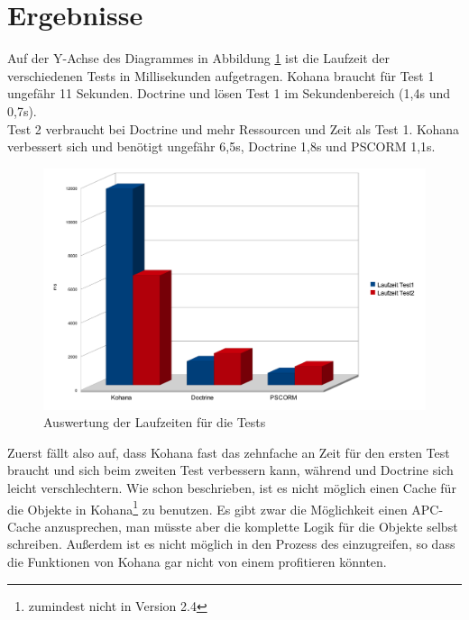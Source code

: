 \section{Ergebnisse} \label{evaluation-results}

Auf der Y-Achse des Diagrammes in Abbildung \ref{evaluation-results-bild} ist die Laufzeit der verschiedenen Tests in Millisekunden aufgetragen. Kohana braucht für Test 1 ungefähr 11 Sekunden. Doctrine und \PSCORM lösen Test 1 im Sekundenbereich (1,4s und 0,7s). \\
Test 2 verbraucht bei Doctrine und \PSCORM mehr Ressourcen und Zeit als Test 1. Kohana verbessert sich und benötigt ungefähr 6,5s, Doctrine 1,8s und PSCORM 1,1s. \\
\begin{figure}[h!]
  \includegraphics[width=\textwidth]{figures/evaluation}
  \caption{Auswertung der Laufzeiten für die Tests}
  \label{evaluation-results-bild}
\end{figure}
\noindent Zuerst fällt also auf, dass Kohana fast das zehnfache an Zeit für den ersten Test braucht und sich beim zweiten Test verbessern kann, während \PSCORM und Doctrine sich leicht verschlechtern. Wie schon beschrieben, ist es nicht möglich einen Cache für die Objekte in Kohana\footnote{zumindest nicht in Version 2.4} zu benutzen. Es gibt zwar die Möglichkeit einen APC-Cache anzusprechen, man müsste aber die komplette Logik für die Objekte selbst schreiben. Außerdem ist es nicht möglich in den Prozess des  einzugreifen, so dass die Funktionen von Kohana gar nicht von einem \objectcache profitieren könnten.\\
